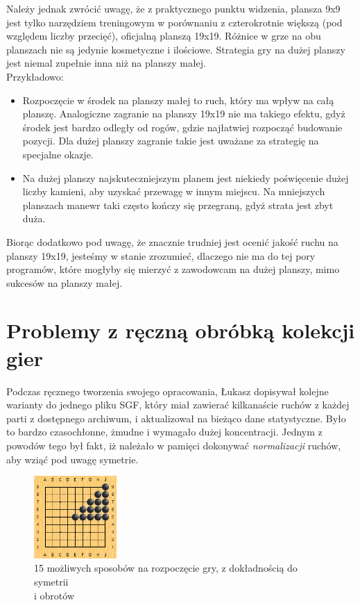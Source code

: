 \documentclass[11pt,leqno]{article}
\begin{document}
Należy jednak zwrócić uwagę, że z praktycznego punktu widzenia, plansza 9x9 jest tylko narzędziem treningowym w 
porównaniu z czterokrotnie większą (pod względem liczby przecięć), oficjalną planszą 19x19. Różnice w grze na obu planszach
 nie są jedynie kosmetyczne i ilościowe. Strategia gry na dużej planszy jest niemal zupełnie inna niż na planszy małej. \\
Przykładowo:
\begin{itemize}
\item Rozpoczęcie w środek na planszy małej to ruch, który ma wpływ na całą planszę. Analogiczne zagranie na planszy 19x19 nie ma takiego 
efektu, gdyż środek jest bardzo odległy od rogów, gdzie najłatwiej rozpocząć budowanie pozycji. Dla dużej planszy zagranie takie jest
 uważane za strategię na specjalne okazje.
\item Na dużej planszy najskuteczniejszym planem jest niekiedy poświęcenie dużej liczby kamieni, aby uzyskać przewagę w innym miejscu.
 Na mniejszych planszach manewr taki często kończy się przegraną, gdyż strata jest zbyt duża.
\end{itemize}

Biorąc dodatkowo pod uwagę, że znacznie trudniej jest ocenić jakość ruchu na planszy 19x19, jesteśmy w stanie zrozumieć, dlaczego 
nie ma do tej pory programów, które mogłyby się mierzyć z zawodowcam na dużej planszy, mimo sukcesów na planszy małej.

\section{Problemy z ręczną obróbką kolekcji gier}

Podczas ręcznego tworzenia swojego opracowania, Łukasz dopisywał kolejne warianty do jednego pliku SGF, który miał 
zawierać kilkanaście ruchów z każdej parti z dostępnego archiwum, i aktualizował na bieżąco dane statystyczne. Było to bardzo 
czasochłonne, żmudne i wymagało dużej koncentracji. Jednym z powodów tego był fakt, iż należało w pamięci dokonywać \emph{normalizacji}
 ruchów, aby wziąć pod uwagę symetrie. 

\begin{figure}
  \vspace{-20pt}
  \begin{center}
    \includegraphics[width=0.28\textwidth]{symetria.png}
  \end{center}
  \vspace{-20pt}
  \caption{15 możliwych sposobów na rozpoczęcie gry, z dokładnością do symetrii \\i obrotów}
  \vspace{-10pt}
\end{figure}
\end{document}
